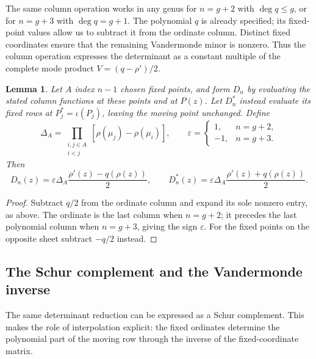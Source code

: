\documentclass[11pt]{article}
\newtheorem{lemma}[theorem]{Lemma}
\begin{document}
The same column operation works in any genus for $n=g+2$ with $\deg q\le g$, or for $n=g+3$ with $\deg q=g+1$. The polynomial $q$ is already specified; its fixed-point values allow us to subtract it from the ordinate column. Distinct fixed coordinates ensure that the remaining Vandermonde minor is nonzero. Thus the column operation expresses the determinant as a constant multiple of the complete mode product $V=(q-\rho')/2$.

\begin{lemma}\label{lem:onishi-interpolation}
Let $A$ index $n-1$ chosen fixed points, and form $D_n$ by evaluating the stated column functions at these points and at $P(z)$. Let $D_n^*$ instead evaluate its fixed rows at $P_j^*=\iota(P_j)$, leaving the moving point unchanged. Define
\[
\Delta_A=\prod_{\substack{i,j\in A\\i<j}}[\rho(\mu_j)-\rho(\mu_i)],\qquad
\varepsilon=\begin{cases}1,&n=g+2,\\-1,&n=g+3.\end{cases}
\]
Then
\begin{equation}\label{eq:onishi-interpolation}
D_n(z)=\varepsilon\Delta_A\frac{\rho'(z)-q(\rho(z))}{2},\qquad
D_n^*(z)=\varepsilon\Delta_A\frac{\rho'(z)+q(\rho(z))}{2}.
\end{equation}
\end{lemma}
\begin{proof}
Subtract $q/2$ from the ordinate column and expand its sole nonzero entry, as above. The ordinate is the last column when $n=g+2$; it precedes the last polynomial column when $n=g+3$, giving the sign $\varepsilon$. For the fixed points on the opposite sheet subtract $-q/2$ instead.
\end{proof}

\subsection{The Schur complement and the Vandermonde inverse}

The same determinant reduction can be expressed as a Schur complement. This makes the role of interpolation explicit: the fixed ordinates determine the polynomial part of the moving row through the inverse of the fixed-coordinate matrix.
\end{document}
